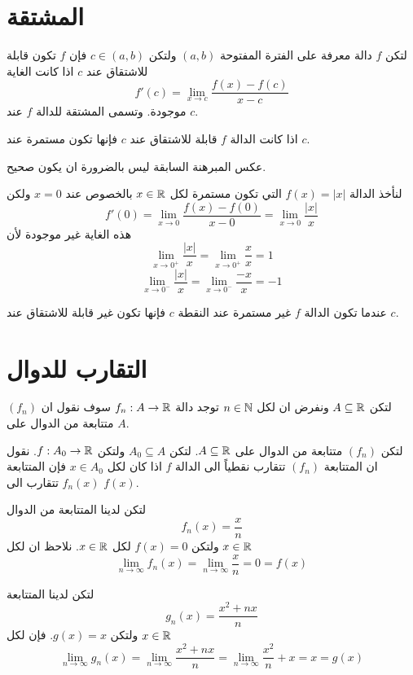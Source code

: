 \section{المشتقة}
\begin{definition}
	لتكن $f$ دالة معرفة على الفترة المفتوحة $(a, b)$ ولتكن $c\in (a, b)$ فإن $f$ تكون قابلة للاشتقاق عند $c$ اذا كانت الغاية
	\[
	f'(c) = \lim\limits_{x\to c} \frac{f(x) - f(c)}{x-c} 
	\]
	موجودة. وتسمى المشتقة للدالة $f$ عند $c$.
\end{definition}

\begin{theorem}
	اذا كانت الدالة $f$ قابلة للاشتقاق عند $c$ فإنها تكون مستمرة عند $c$.
\end{theorem}

\begin{note}
	عكس المبرهنة السابقة ليس بالضرورة ان يكون صحيح. 
\end{note}

\begin{example}
		
	لنأخذ الدالة $f(x) = |x|$ التي تكون مستمرة لكل $x\in\mathbb{R}$ بالخصوص عند $x=0$ ولكن
	\[
	f'(0) = \lim\limits_{x\to0}\frac{f(x)-f(0)}{x-0} = \lim\limits_{x\to 0}\frac{|x|}{x}
	\]
	هذه الغاية غير موجودة لأن 
	\[
	\lim\limits_{x\to0^+} \frac{|x|}{x} = \lim\limits_{x\to0^+} \frac{x}{x} =1
	\]
	\[
	\lim\limits_{x\to0^-} \frac{|x|}{x} = \lim\limits_{x\to0^-} \frac{-x}{x}=- 1
	\]
\end{example}

	
	\begin{note}
		عندما تكون الدالة $f$ غير مستمرة عند النقطة $c$ فإنها تكون غير قابلة للاشتقاق عند $c$.
	\end{note}

\section{التقارب للدوال} 
لتكن $A\subseteq\mathbb{R}$ ونفرض ان لكل $n\in\mathbb{N}$ توجد دالة $f_n:A\to\mathbb{R}$ سوف نقول ان $(f_n)$ متتابعة من الدوال على $A$.
\begin{definition}
 	لتكن $(f_n)$ متتابعة من الدوال على $A\subseteq\mathbb{R}$. لتكن $A_0\subseteq A$ ولتكن $f:A_0\to\mathbb{R}$. نقول ان المتتابعة $(f_n)$ تتقارب نقطياً الى الدالة $f$ اذا كان لكل $x\in A_0 $ فإن المتتابعة $f_n(x)$ تتقارب الى $f(x)$.
\end{definition}

\begin{example}
	 لتكن لدينا المتتابعة من الدوال
	\[
	f_n(x) = \frac{x}{n}
	\]
	ولتكن $f(x) = 0$ لكل $x\in \mathbb{R}$. نلاحظ ان لكل $x\in \mathbb{R}$
	\[
	\lim\limits_{n\to \infty}f_n(x)  = \lim\limits_{n\to \infty}\frac{x}{n} = 0 = f(x)
	\]
	\end{example}
\begin{example}
لتكن لدينا المتتابعة 
	\[
	g_n(x) = \frac{x^2 + nx}{n}
	\]
	ولتكن $g(x) = x$. فإن لكل $x\in\mathbb{R}$
	\[
	\lim\limits_{n\to \infty}g_n(x)  = \lim\limits_{n\to \infty}\frac{x^2+nx}{n} = \lim\limits_{n\to \infty}\frac{x^2}{n} + x = x = g(x)
	\]
\end{example}

